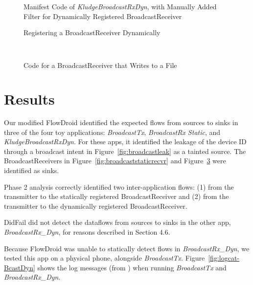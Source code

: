 \begin{figure}[!h]
\begin{framed}

\caption[Manifest Code of \emph{KludgeBroadcastRxDyn}]{Manifest Code of \emph{KludgeBroadcastRxDyn}, with Manually Added Filter for Dynamically Registered BroadcastReceiver}
\label{fig:broadcastDynManifestKludge}
\end{framed}
\end{figure}

\begin{figure}[!h]
\begin{framed}

\caption{Registering a BroadcastReceiver Dynamically}
\label{fig:broadcastregister}
\end{framed}
\end{figure}

\
\begin{figure}[!h]
\begin{framed}

\caption{Code for a BroadcastReceiver that Writes to a File}
\label{fig:broadcastdynrecvr}
\end{framed}
\end{figure}

\section{Results}

Our modified FlowDroid identified the expected flows from sources to sinks in three of the four toy applications: \textit{BroadcastTx}, \textit{BroadcastRx Static}, and \textit{KludgeBroadcastRxDyn}. For these apps, it identified the leakage of the device ID through a broadcast intent in Figure~\ref{fig:broadcastleak} as a tainted source. The BroadcastReceivers in Figure~\ref{fig:broadcaststaticrecvr} and Figure~\ref{fig:broadcastdynrecvr} were identified as sinks.

Phase 2 analysis correctly identified two inter-application flows: (1) from the transmitter to the statically registered BroadcastReceiver and (2) from the transmitter to the dynamically registered BroadcastReceiver.

DidFail did not detect the dataflows from sources to sinks in the other app, \textit{BroadcastRx\_Dyn}, for reasons described in Section 4.6.

Because FlowDroid was unable to statically detect flows in \textit{BroadcastRx\_Dyn}, we tested this app on a physical phone, alongside \textit{BroadcastTx}. Figure~\ref{fig:logcat-BcastDyn} shows the log messages (from ) when running \textit{BroadcastTx} and \textit{BroadcastRx\_Dyn}.

